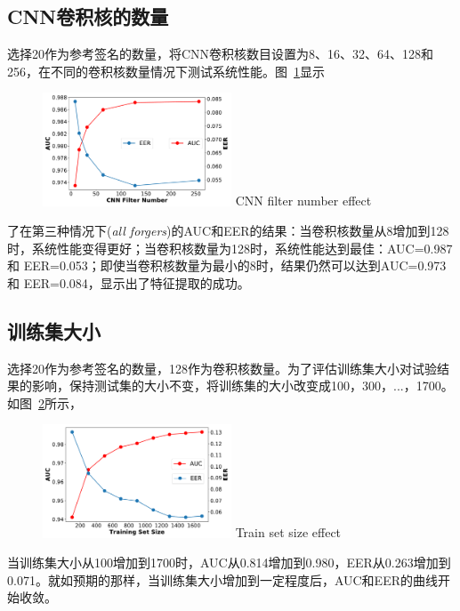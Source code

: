 \subsection{CNN卷积核的数量}
选择20作为参考签名的数量，将CNN卷积核数目设置为8、16、32、64、128和256，在不同的卷积核数量情况下测试系统性能。图~\ref{fig:filter-number-effect}显示
\begin{figure}[!htp]
  \centering
  \includegraphics[width=0.5\textwidth]{figure/filter_number_auc_eer.pdf}
      {CNN filter number effect }
  \label{fig:filter-number-effect}
\end{figure}
了在第三种情况下(\textit{all forgers})的AUC和EER的结果：当卷积核数量从8增加到128时，系统性能变得更好；当卷积核数量为128时，系统性能达到最佳：AUC=0.987 和 EER=0.053；即使当卷积核数量为最小的8时，结果仍然可以达到AUC=0.973 和 EER=0.084，显示出了特征提取的成功。 

\subsection{训练集大小}
选择20作为参考签名的数量，128作为卷积核数量。为了评估训练集大小对试验结果的影响，保持测试集的大小不变，将训练集的大小改变成100，300，...，1700。如图~\ref{fig:train-size-effect}所示，
\begin{figure}[!htp]
  \centering
  \includegraphics[width=0.5\textwidth]{figure/train_size_auc_eer.pdf}
      {Train set size effect }
  \label{fig:train-size-effect}
\end{figure}
当训练集大小从100增加到1700时，AUC从0.814增加到0.980，EER从0.263增加到0.071。就如预期的那样，当训练集大小增加到一定程度后，AUC和EER的曲线开始收敛。

